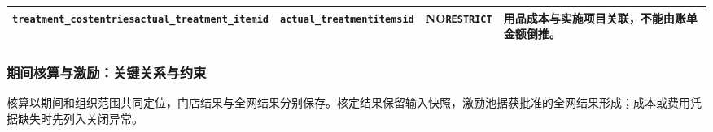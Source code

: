 \begin{longtable}{@{}L{43mm}L{32mm}L{24mm}L{49mm}@{}}
\texttt{treatment\_cost}\newline\texttt{entries}\newline\texttt{actual\_treatment\_item}\newline\texttt{id} & \texttt{actual\_treatment}\newline\texttt{items}\newline\texttt{id} & NO\newline\texttt{RESTRICT} & 用品成本与实施项目关联，不能由账单金额倒推。\\
\bottomrule\end{longtable}\endgroup


\subsubsection{期间核算与激励：关键关系与约束}
核算以期间和组织范围共同定位，门店结果与全网结果分别保存。核定结果保留输入快照，激励池据获批准的全网结果形成；成本或费用凭据缺失时先列入关闭异常。

